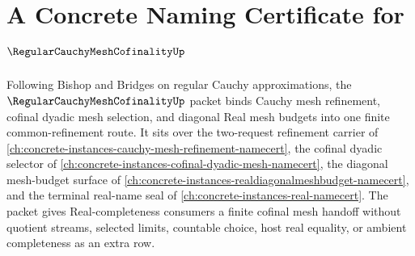 \chapter{A Concrete Naming Certificate for $\RegularCauchyMeshCofinalityUp$}
\label{ch:concrete-instances-regular-cauchy-mesh-cofinality-namecert}

Following Bishop and Bridges on regular Cauchy approximations, the $\RegularCauchyMeshCofinalityUp$ packet binds Cauchy mesh refinement, cofinal dyadic mesh selection, and diagonal Real mesh budgets into one finite common-refinement route. It sits over the two-request refinement carrier of \autoref{ch:concrete-instances-cauchy-mesh-refinement-namecert}, the cofinal dyadic selector of \autoref{ch:concrete-instances-cofinal-dyadic-mesh-namecert}, the diagonal mesh-budget surface of \autoref{ch:concrete-instances-realdiagonalmeshbudget-namecert}, and the terminal real-name seal of \autoref{ch:concrete-instances-real-namecert}. The packet gives Real-completeness consumers a finite cofinal mesh handoff without quotient streams, selected limits, countable choice, host real equality, or ambient completeness as an extra row.

